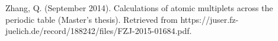 \documentclass[12pt]{article}
\begin{document}

\begin{thebibliography}{9}%
 Zhang, Q. (September 2014). Calculations of atomic multiplets across the periodic table (Master’s thesis). Retrieved from https://juser.fz-juelich.de/record/188242/files/FZJ-2015-01684.pdf.
\end{thebibliography}
\end{document}

